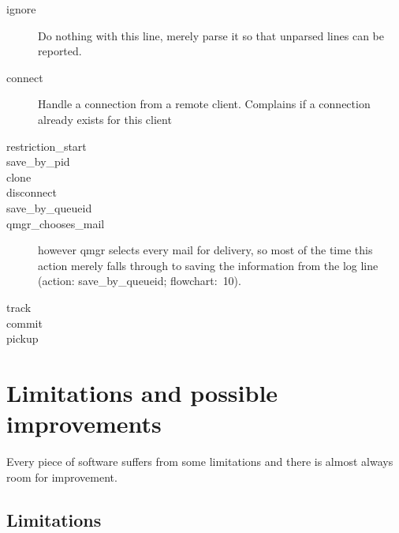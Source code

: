 \documentclass[a4paper,12pt,draft]{article}
\begin{document}
\begin{description}

    \item [ignore] Do nothing with this line, merely parse it so that
        unparsed lines can be reported.

    \item [connect] Handle a connection from a remote client.  Complains if
        a connection already exists for this client

    \item [restriction\_start] 

    \item [save\_by\_pid] 

    \item [clone] 

    \item [disconnect] 

    \item [save\_by\_queueid] 

    \item [qmgr\_chooses\_mail] 
        however qmgr selects every mail for delivery, so most of the time
        this action merely falls through to saving the information from the
        log line (action: save\_by\_queueid; flowchart:~10).

    \item [track] 

    \item [commit] 

    \item [pickup] 

\end{description}


\section{Limitations and possible improvements}

Every piece of software suffers from some limitations and there is almost
always room for improvement.

\subsection{Limitations}
\end{document}
